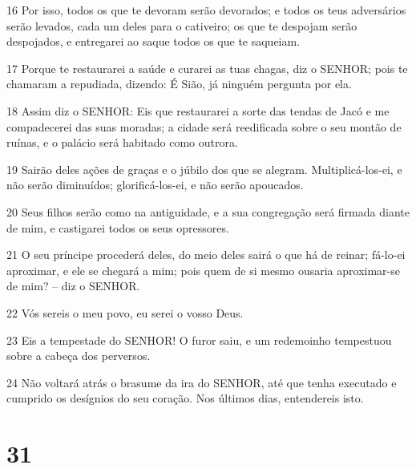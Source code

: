 \par 16 Por isso, todos os que te devoram serão devorados; e todos os teus adversários serão levados, cada um deles para o cativeiro; os que te despojam serão despojados, e entregarei ao saque todos os que te saqueiam.
\par 17 Porque te restaurarei a saúde e curarei as tuas chagas, diz o SENHOR; pois te chamaram a repudiada, dizendo: É Sião, já ninguém pergunta por ela.
\par 18 Assim diz o SENHOR: Eis que restaurarei a sorte das tendas de Jacó e me compadecerei das suas moradas; a cidade será reedificada sobre o seu montão de ruínas, e o palácio será habitado como outrora.
\par 19 Sairão deles ações de graças e o júbilo dos que se alegram. Multiplicá-los-ei, e não serão diminuídos; glorificá-los-ei, e não serão apoucados.
\par 20 Seus filhos serão como na antiguidade, e a sua congregação será firmada diante de mim, e castigarei todos os seus opressores.
\par 21 O seu príncipe procederá deles, do meio deles sairá o que há de reinar; fá-lo-ei aproximar, e ele se chegará a mim; pois quem de si mesmo ousaria aproximar-se de mim? -- diz o SENHOR.
\par 22 Vós sereis o meu povo, eu serei o vosso Deus.
\par 23 Eis a tempestade do SENHOR! O furor saiu, e um redemoinho tempestuou sobre a cabeça dos perversos.
\par 24 Não voltará atrás o brasume da ira do SENHOR, até que tenha executado e cumprido os desígnios do seu coração. Nos últimos dias, entendereis isto.

\chapter{31}

